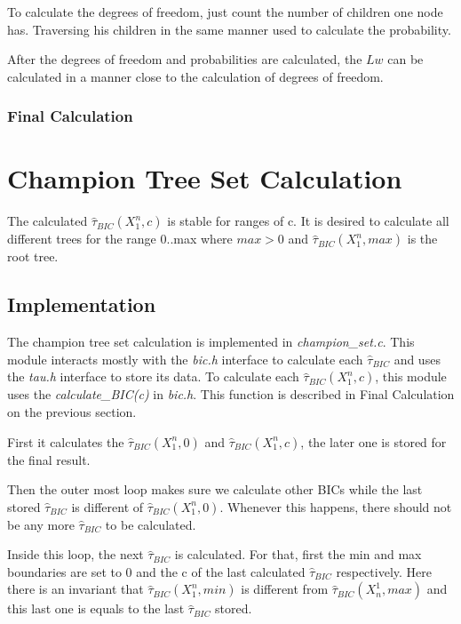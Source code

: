 \documentclass[brazil,11pt]{article}
\begin{document}
To calculate the degrees of freedom, just count the number of children one node has. Traversing his children in the same manner used to calculate the probability.

After the degrees of freedom and probabilities are calculated, the $Lw$ can be calculated in a manner close to the calculation of degrees of freedom.

\subsubsection{Final Calculation}



\section{Champion Tree Set Calculation}

The calculated $\hat{\tau}_{BIC}(X^n_1, c)$ is stable for ranges of c. It is desired to calculate all different trees for the range 0..max where $max > 0$ and $\hat{\tau}_{BIC}(X^n_1, max)$ is the root tree.

\subsection{Implementation}

The champion tree set calculation is implemented in \emph{champion\_set.c}. This module interacts mostly with the \emph{bic.h} interface to calculate each $\hat{\tau}_{BIC}$ and uses the \emph{tau.h} interface to store its data. To calculate each $\hat{\tau}_{BIC}(X^n_1, c)$, this module uses the \emph{calculate\_BIC(c)} in \emph{bic.h}. This function is described in Final Calculation on the previous section.

First it calculates the $\hat{\tau}_{BIC}(X^n_1, 0)$ and $\hat{\tau}_{BIC}(X^n_1, c)$, the later one is stored for the final result.

Then the outer most loop makes sure we calculate other BICs while the last stored $\hat{\tau}_{BIC}$ is different of $\hat{\tau}_{BIC}(X^n_1, 0)$. Whenever this happens, there should not be any more $\hat{\tau}_{BIC}$ to be calculated.

Inside this loop, the next $\hat{\tau}_{BIC}$ is calculated. For that, first the min and max boundaries are set to 0 and the c of the last calculated $\hat{\tau}_{BIC}$ respectively. Here there is an invariant that $\hat{\tau}_{BIC}(X^n_1, min)$ is different from $\hat{\tau}_{BIC}(X^1_n, max)$ and this last one is equals to the last $\hat{\tau}_{BIC}$ stored.
\end{document}
